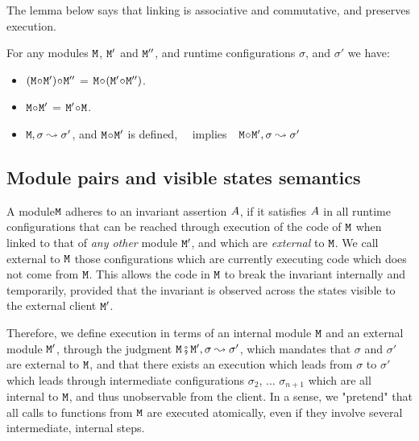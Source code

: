 The lemma below says  that linking is associative and commutative, and preserves execution.
 
 \begin{lemma}
 For any modules $\M$,   $\M'$ and $\M''$, and runtime configurations $\sigma$, and $\sigma'$ we have$:$
 \label{lemma:linking:properties}
 
 \begin{itemize}
     \item 
     $(\M \link \M')\link \M''$ = $\M \link (\M' \link \M'')$.
    \item  
      $\M \link \M'$  = $\M' \link\M$.
      \item
      $\M, \sigma \leadsto \sigma'$, and $\M\link \M'$ is defined, \  \  implies\ \   $\M\link \M', \sigma \leadsto \sigma'$
   \end{itemize}
 
 \end{lemma}
 
 \subsection{Module pairs and visible states semantics}
 
A module$\M$ adheres to an invariant assertion  $\A$, if it satisfies 
$\A$ in all runtime configurations that  can be reached through execution of the code of $\M$ when linked to that
of {\em any other} module $\M'$, and
which are {\em external} to $\M$. We call external to $\M$ those 
configurations which are currently executing code which does not come from $\M$. This allows the code in $\M$ to break 
the invariant internally and temporarily, provided that the invariant is observed across the states visible to the external client $\M'$.

Therefore, we define execution in terms of an internal module $\M$ and an external module $\M'$, through the judgment $\M \mkpair \M', \sigma \leadsto \sigma'$, which mandates that $\sigma$ and $\sigma'$ are external to $\M$, and that there exists an execution which leads from $\sigma$ to $\sigma'$ which leads through intermediate configurations 
$\sigma_2$, ...  $\sigma_{n+1}$ which are all internal to $\M$, and thus unobservable from the client.
In a sense, we "pretend" that all calls to functions from $\M$ are executed atomically, even if they involve several intermediate, 
internal steps.

